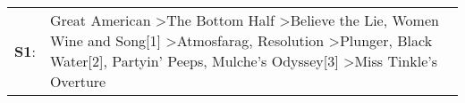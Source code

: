 \begin{supertabular}{p{0.03\textwidth}p{0.92\textwidth}}
 \textbf{S1}:  &  Great American\textsuperscript{} \textgreater \enspace The Bottom Half\textsuperscript{} \textgreater \enspace Believe the Lie\textsuperscript{}, \enspace Women Wine and Song[1]\textsuperscript{} \textgreater \enspace Atmosfarag\textsuperscript{}, \enspace Resolution\textsuperscript{} \textgreater \enspace Plunger\textsuperscript{}, \enspace Black Water[2]\textsuperscript{}, \enspace Partyin' Peeps\textsuperscript{}, \enspace Mulche's Odyssey[3]\textsuperscript{} \textgreater \enspace Miss Tinkle's Overture\textsuperscript{}  \enspace  \\
\end{supertabular}

